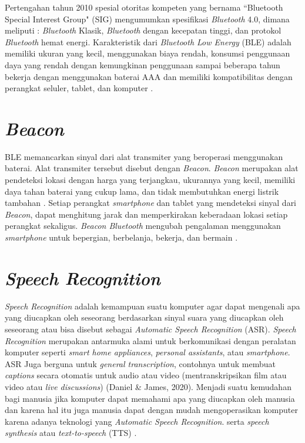 \par Pertengahan tahun 2010 spesial otoritas kompeten yang bernama “Bluetooth Special Interest Group" (SIG) mengumumkan spesifikasi \textit{Bluetooth} 4.0, dimana meliputi : \textit{Bluetooth} Klasik, \textit{Bluetooth} dengan kecepatan tinggi, dan protokol \textit{Bluetooth} hemat energi. Karakteristik dari \textit{Bluetooth Low Energy} (BLE) adalah memiliki ukuran yang kecil, menggunakan biaya rendah, konsumsi penggunaan daya yang rendah dengan kemungkinan penggunaan sampai beberapa tahun bekerja dengan menggunakan baterai AAA dan memiliki kompatibilitas dengan perangkat seluler, tablet, dan komputer \citep{kaluvza2017analysis}.



\section{\textit{Beacon}}
BLE memancarkan sinyal dari alat transmiter yang beroperasi menggunakan baterai. Alat transmiter tersebut disebut dengan \textit{Beacon}. \textit{Beacon} merupakan alat pendeteksi lokasi dengan harga yang terjangkau, ukurannya yang kecil, memiliki daya tahan baterai yang cukup lama, dan tidak membutuhkan energi listrik tambahan \citep{puspitasari2020}. Setiap perangkat \textit{smartphone} dan tablet yang mendeteksi sinyal dari \textit{Beacon}, dapat menghitung jarak dan memperkirakan keberadaan lokasi setiap perangkat sekaligus. \textit{Beacon Bluetooth} mengubah pengalaman menggunakan \textit{smartphone} untuk bepergian, berbelanja, bekerja, dan bermain \citep{kaluvza2017analysis}.

\section{\textit{Speech Recognition}}
\textit{Speech Recognition} adalah kemampuan suatu komputer agar dapat mengenali apa yang diucapkan oleh seseorang berdasarkan sinyal suara yang diucapkan oleh seseorang atau bisa disebut sebagai \textit{Automatic Speech Recognition} (ASR)\citep{jurafskyspeech2008}. \textit{Speech Recognition} merupakan antarmuka alami untuk berkomunikasi dengan peralatan komputer seperti \textit{smart home appliances}, \textit{personal assistants}, atau \textit{smartphone}. ASR Juga berguna untuk \textit{general transcription}, contohnya untuk membuat \textit{captions} secara otomatis untuk audio atau video (mentranskripsikan film atau video atau \textit{live discussions}) (Daniel & James, 2020). Menjadi suatu kemudahan bagi manusia jika komputer dapat memahami apa yang diucapkan oleh manusia dan karena hal itu juga manusia dapat dengan mudah mengoperasikan komputer karena adanya teknologi yang \textit{Automatic Speech Recognition}. serta \textit{speech synthesis} atau \textit{text-to-speech} (TTS) \citep{jurafskyspeech2008}.

